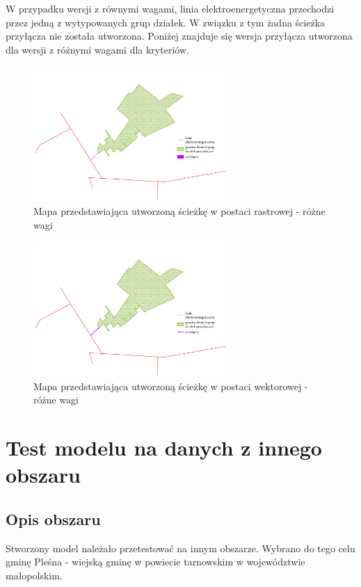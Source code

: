 \documentclass{article}
\begin{document}
W przypadku wersji z równymi wagami, linia elektroenergetyczna przechodzi przez jedną z wytypowanych grup działek. W związku z tym żadna ścieżka przyłącza nie została utworzona. Poniżej znajduje się wersja przyłącza utworzona dla wersji z różnymi wagami dla kryteriów.

\begin{figure}[H]
    \centering
    \includegraphics[width=0.65\textwidth]{img/roznewagi-path-raster.jpg}
    \caption{Mapa przedstawiająca utworzoną ścieżkę w postaci rastrowej - różne wagi}
\end{figure}

\begin{figure}[H]
    \centering
    \includegraphics[width=0.65\textwidth]{img/roznewagi-path-vector.jpg}
    \caption{Mapa przedstawiająca utworzoną ścieżkę w postaci wektorowej - różne wagi}
\end{figure}
\newpage

\section{Test modelu na danych z innego obszaru}
\subsection{Opis obszaru}
Stworzony model należało przetestować na innym obszarze. Wybrano do tego celu gminę Pleśna - wiejską gminę w powiecie tarnowskim w województwie małopolskim.
\end{document}
